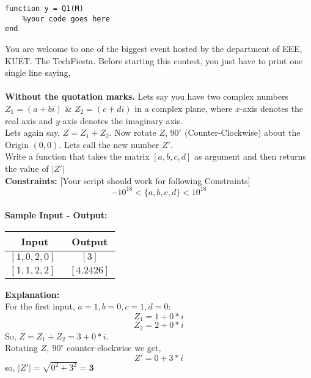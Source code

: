 \documentclass[11pt,paper=a4,answers]{exam}
\begin{document}
\begin{lstlisting}
function y = Q1(M)
    %your code goes here
end
\end{lstlisting}
\begin{questions}

\pointsinrightmargin
\pointsdroppedatright
\marksnotpoints
\pointformat{\boldmath\themarginpoints}
\bracketedpoints
\question[10]
\label{Q:zbus}
You are welcome to one of the biggest event hosted by the department of EEE, KUET. The TechFiesta. Before starting this contest, you just have to print one single line saying,\\ {} \\ {\bfseries Without the quotation marks.}
\droppoints
\newpage
\question[10]
\label{Q:zbus}
Lets say you have two complex numbers $Z_1 = (a + bi)$ \& $Z_2 = (c + di)$ in a complex plane, where $x$-axis denotes the real axis and $y$-axis denotes the imaginary axis.\\
Lets again say, $Z = Z_1 + Z_2$. Now rotate $Z$, $90^{\circ}$ (Counter-Clockwise) about the Origin $(0,0)$. Lets call the new number $Z'$.
\\Write a function that takes the matrix $[a, b, c, d]$ as argument and then returns the value of $|Z'|$\\

\textbf{ Constraints:} [{\footnotesize Your script should work for following Constraints}]
$$ -10^{18} < \{ a, b, c, d \} < 10^{18}$$ \\

\textbf{ Sample Input - Output:}\\
\begin{center}
\begin{tabular}{|c|c|}
\hline
\textbf{Input} & \textbf{Output}\\
\hline
$[1, 0, 2, 0]\ \ $ & $[3]$ \\
$[1, 1, 2, 2]\ \ $ & $[4.2426]$ \\
\hline
\end{tabular}
\end{center}

\textbf{Explanation:} \\
For the first input, $a = 1, b = 0, c = 1, d = 0$:$$Z_1 = 1 + 0*i$$ $$Z_2 = 2 + 0*i$$
So, $Z = Z_1 + Z_2 = 3 + 0*i$. \\Rotating $Z,\  90^{\circ}$ counter-clockwise we get, $$Z' = 0 + 3*i$$
so, $|Z'| = \sqrt{0^2 + 3^2} = \textbf {3}$
\\



\end{questions}
\end{document}
